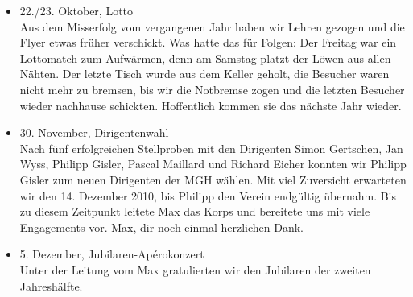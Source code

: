 \begin{history}
\begin{itemize}
        \item 22./23. Oktober, Lotto\\
              Aus dem Misserfolg vom vergangenen Jahr haben wir Lehren gezogen und die
              Flyer etwas früher verschickt. Was hatte das für Folgen: Der Freitag war
              ein Lottomatch zum Aufwärmen, denn am Samstag platzt der Löwen aus allen
              Nähten. Der letzte Tisch wurde aus dem Keller geholt, die Besucher waren
              nicht mehr zu bremsen, bis wir die Notbremse zogen und die letzten
              Besucher wieder nachhause schickten. Hoffentlich kommen sie das nächste
              Jahr wieder.

        \item 30. November, Dirigentenwahl\\
              Nach fünf erfolgreichen Stellproben mit den Dirigenten Simon Gertschen,
              Jan Wyss, Philipp Gisler, Pascal Maillard und Richard Eicher konnten wir
              Philipp Gisler zum neuen Dirigenten der MGH wählen. Mit viel Zuversicht
              erwarteten wir den 14. Dezember 2010, bis Philipp den Verein endgültig
              übernahm. Bis zu diesem Zeitpunkt leitete Max das Korps und bereitete
              uns mit viele Engagements vor. Max, dir noch einmal herzlichen Dank.

        \item 5. Dezember, Jubilaren-Apérokonzert\\
              Unter der Leitung vom Max gratulierten wir den Jubilaren der zweiten
              Jahreshälfte.

    \end{itemize}

\end{history}
